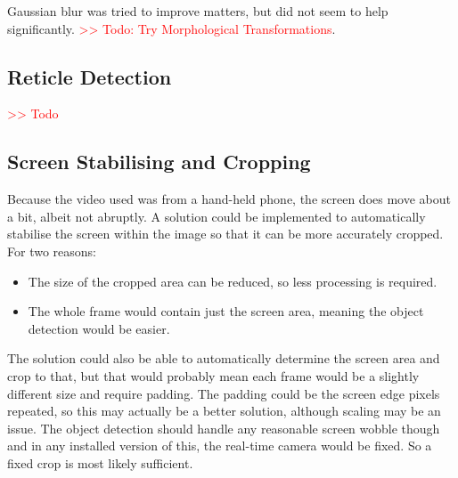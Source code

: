 \documentclass[final]{cmpreport_02}
\begin{document}
Gaussian blur was tried to improve matters, but did not seem to help significantly. \textcolor{red}{>> Todo: Try Morphological Transformations}.

\subsection{Reticle Detection}

\textcolor{red}{>> Todo}

\subsection{Screen Stabilising and Cropping}

Because the video used was from a hand-held phone, the screen does move about a bit, albeit not abruptly. A solution could be implemented to automatically stabilise the screen within the image so that it can be more accurately cropped. For two reasons:
\begin{itemize}
	\item The size of the cropped area can be reduced, so less processing is required.
	\item The whole frame would contain just the screen area, meaning the object detection would be easier.
\end{itemize}

The solution could also be able to automatically determine the screen area and crop to that, but that would probably mean each frame would be a slightly different size and require padding. The padding could be the screen edge pixels repeated, so this may actually be a better solution, although scaling may be an issue. The object detection should handle any reasonable screen wobble though and in any installed version of this, the real-time camera would be fixed. So a fixed crop is most likely sufficient.


\clearpage




\clearpage
\appendix


%
\end{document}
